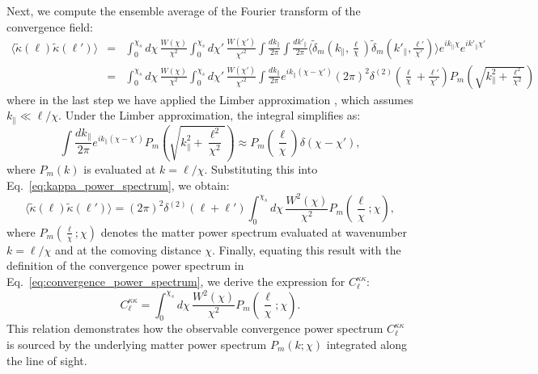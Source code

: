 Next, we compute the ensemble average of the Fourier transform of the convergence field:
\begin{eqnarray}
    \langle \tilde{\kappa}(\boldsymbol{\ell}) \tilde{\kappa}(\boldsymbol{\ell}') \rangle &=& \int_0^{\chi_s} d\chi \, \frac{W(\chi)}{\chi^2} \int_0^{\chi_s} d\chi' \, \frac{W(\chi')}{\chi'^2} \int \frac{dk_\parallel}{2\pi} \int \frac{dk'_\parallel}{2\pi} \langle \tilde{\delta}_m\left(k_\parallel, \frac{\boldsymbol{\ell}}{\chi}\right) \tilde{\delta}_m\left(k'_\parallel, \frac{\boldsymbol{\ell}'}{\chi'}\right) \rangle e^{i k_\parallel \chi} e^{i k'_\parallel \chi'} \nonumber \\
    &=& \int_0^{\chi_s} d\chi \, \frac{W(\chi)}{\chi^2} \int_0^{\chi_s} d\chi' \, \frac{W(\chi')}{\chi'^2} \int \frac{dk_\parallel}{2\pi} e^{i k_\parallel (\chi - \chi')} (2\pi)^2 \delta^{(2)}\left(\frac{\boldsymbol{\ell}}{\chi} + \frac{\boldsymbol{\ell}'}{\chi'}\right) P_m\left(\sqrt{k_\parallel^2 + \frac{\ell^2}{\chi^2}}\right) \nonumber 
    \label{eq:kappa_power_spectrum}
\end{eqnarray}
where in the last step we have applied the Limber approximation \citep{1954ApJ...119..655L}, which assumes \( k_\parallel \ll \ell/\chi \).
Under the Limber approximation, the integral simplifies as:
\begin{equation}
    \int \frac{dk_\parallel}{2\pi} e^{i k_\parallel (\chi - \chi')} P_m\left(\sqrt{k_\parallel^2 + \frac{\ell^2}{\chi^2}}\right) \approx P_m\left(\frac{\ell}{\chi}\right) \delta(\chi - \chi'),
    \label{eq:limber_approximation}
\end{equation}
where \( P_m(k) \) is evaluated at \( k = \ell/\chi \).
Substituting this into Eq.~\eqref{eq:kappa_power_spectrum}, we obtain:
\begin{equation}
    \langle \tilde{\kappa}(\boldsymbol{\ell}) \tilde{\kappa}(\boldsymbol{\ell}') \rangle = (2\pi)^2 \delta^{(2)}(\boldsymbol{\ell} + \boldsymbol{\ell}') \int_0^{\chi_s} d\chi \, \frac{W^2(\chi)}{\chi^2} P_m\left(\frac{\ell}{\chi}; \chi\right),
    \label{eq:kappa_power_spectrum_final}
\end{equation}
where \( P_m\left(\frac{\ell}{\chi}; \chi\right) \) denotes the matter power spectrum evaluated at wavenumber \( k = \ell/\chi \) and at the comoving distance \( \chi \).
Finally, equating this result with the definition of the convergence power spectrum in Eq.~\eqref{eq:convergence_power_spectrum}, we derive the expression for \( C_{\ell}^{\kappa\kappa} \):
\begin{equation}
    C_{\ell}^{\kappa\kappa} = \int_0^{\chi_s} d\chi \, \frac{W^2(\chi)}{\chi^2} P_m\left(\frac{\ell}{\chi}; \chi\right).
    \label{eq:convergence_power_spectrum_final}
\end{equation}
This relation demonstrates how the observable convergence power spectrum \( C_{\ell}^{\kappa\kappa} \) is sourced by the underlying matter power spectrum \( P_m(k; \chi) \) integrated along the line of sight.

